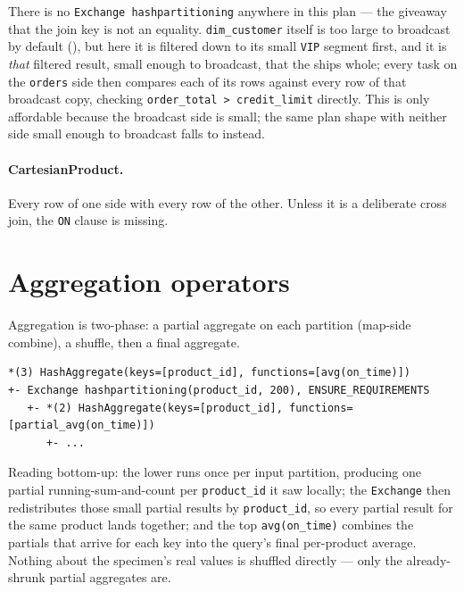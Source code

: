 There is no \texttt{Exchange hashpartitioning} anywhere in this plan ---
the giveaway that the join key is not an equality. \texttt{dim\_customer}
itself is too large to broadcast by default (), but
here it is filtered down to its small \texttt{VIP} segment first, and it is
\emph{that} filtered result, small enough to broadcast, that the
 ships whole; every task on the \texttt{orders}
side then compares each of its rows against every row of that broadcast
copy, checking \texttt{order\_total > credit\_limit} directly. This is only
affordable because the broadcast side is small; the same plan shape with
neither side small enough to broadcast falls to 
instead.

\paragraph{CartesianProduct.} Every row of one side with every row of the other.
Unless it is a deliberate cross join, the \texttt{ON} clause is missing.

\section{Aggregation operators}
\label{sec:c-agg}

Aggregation is two-phase: a partial aggregate on each partition (map-side
combine), a shuffle, then a final aggregate.

\begin{lstlisting}[language=text,numbers=none,caption={Two-phase aggregation},captionpos=b]
*(3) HashAggregate(keys=[product_id], functions=[avg(on_time)])
+- Exchange hashpartitioning(product_id, 200), ENSURE_REQUIREMENTS
   +- *(2) HashAggregate(keys=[product_id], functions=[partial_avg(on_time)])
      +- ...
\end{lstlisting}

Reading bottom-up: the lower  runs once per
input partition, producing one partial running-sum-and-count per
\texttt{product\_id} it saw locally; the \texttt{Exchange} then redistributes
those small partial results by \texttt{product\_id}, so every partial result
for the same product lands together; and the top \texttt{avg(on\_time)}
combines the partials that arrive for each key into the query's final
per-product average. Nothing about the specimen's real values is shuffled
directly --- only the already-shrunk partial aggregates are.

